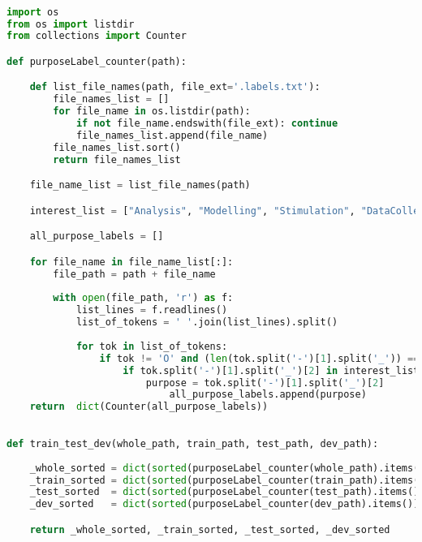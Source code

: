 \begin{lstlisting}[language=python,frame=tb,caption={Function to retrieve counts of class labels in each data split},label=lst:useless]

import os
from os import listdir 
from collections import Counter

def purposeLabel_counter(path):

	def list_file_names(path, file_ext='.labels.txt'):
		file_names_list = []		
		for file_name in os.listdir(path):
			if not file_name.endswith(file_ext): continue
			file_names_list.append(file_name) 
		file_names_list.sort()
		return file_names_list

	file_name_list = list_file_names(path)

	interest_list = ["Analysis", "Modelling", "Stimulation", "DataCollection", "DataPreProcss","Simulation", "Visualization", "Programming"]

	all_purpose_labels = []

	for file_name in file_name_list[:]:
		file_path = path + file_name
		
		with open(file_path, 'r') as f:
			list_lines = f.readlines()
			list_of_tokens = ' '.join(list_lines).split()
			
			for tok in list_of_tokens:
				if tok != 'O' and (len(tok.split('-')[1].split('_')) == 3 ):
					if tok.split('-')[1].split('_')[2] in interest_list:
						purpose = tok.split('-')[1].split('_')[2]
							all_purpose_labels.append(purpose)
	return  dict(Counter(all_purpose_labels))
\end{lstlisting}


\begin{lstlisting}[language=python,frame=tb,caption={Function to retrieve software usage purpose class labels in whole-document, train, test, and development list},label=lst:useless]

def train_test_dev(whole_path, train_path, test_path, dev_path):
	
	_whole_sorted = dict(sorted(purposeLabel_counter(whole_path).items()))
	_train_sorted = dict(sorted(purposeLabel_counter(train_path).items()))
	_test_sorted  = dict(sorted(purposeLabel_counter(test_path).items()))
	_dev_sorted   = dict(sorted(purposeLabel_counter(dev_path).items()))

	return _whole_sorted, _train_sorted, _test_sorted, _dev_sorted

\end{lstlisting}

